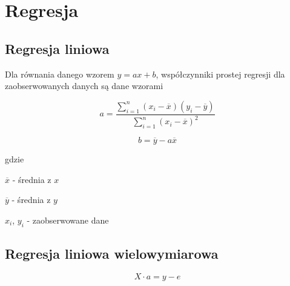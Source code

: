 \section*{Regresja}
\subsection*{Regresja liniowa}

Dla równania danego wzorem $y = ax + b$, współczynniki prostej regresji
dla zaobserwowanych danych są dane wzorami

\begin{equation*}
    a = \frac{\sum_{i=1}^{n} 
    (x_i - \overline{x})
    (y_i - \overline{y})}
    {\sum_{i=1}^{n} (x_i - \overline{x})^2}
\end{equation*}

\vspace{1em}

\begin{equation*}
    b = \overline{y} - a \overline{x}
\end{equation*}

gdzie

$\overline{x}$ - średnia z $x$

$\overline{y}$ - średnia z $y$

$x_i$, $y_i$ - zaobserwowane dane

\subsection*{Regresja liniowa wielowymiarowa}

\begin{equation*}
    X \cdot a = y - e
\end{equation*}

